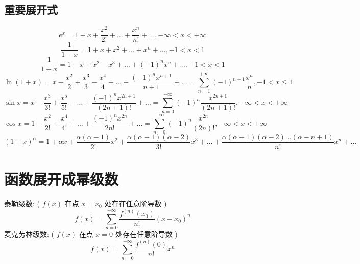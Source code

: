 \subsection{重要展开式}
\begin{theorem}\label{the: 重要幂级数展开式}
	$$e^{x}=1+x+\frac{x^2}{2!}+\dots+\frac{x^n}{n!}+\dots ,-\infty<x<+\infty$$
	$$\frac{1}{1-x}=1+x+x^2+\dots+x^{n}+\dots,-1<x<1$$
	$$\frac{1}{1+x}=1-x+x^2-x^3+\dots+(-1)^{n}x^{n}+\dots,-1<x<1$$
	$$\ln(1+x)=x-\frac{x^2}{2}+\frac{x^3}{3}-\frac{x^4}{4}+\dots+\frac{(-1)^nx^{n+1}}{n+1}+\dots=\sum\limits_{n=1}^{+\infty}(-1)^{n-1}\frac{x^{n}}{n},-1<x\leq 1$$
	$$\sin x=x-\frac{x^3}{3!}+\frac{x^5}{5!}-\dots+\frac{(-1)^{n}x^{2n+1}}{(2n+1)!}+\dots=\sum\limits_{n=0}^{+\infty}(-1)^{n}\frac{x^{2n+1}}{(2n+1)!},-\infty<x<+\infty$$
	$$\cos x=1-\frac{x^2}{2!}+\frac{x^4}{4!}+\dots+\frac{(-1)^nx^{2n}}{2n!}+\dots=\sum\limits_{n=0}^{+\infty}(-1)^{n}\frac{x^{2n}}{(2n)!},-\infty<x<+\infty$$
	$$(1+x)^{\alpha}=1+\alpha x+\frac{\alpha (\alpha-1)}{2!}x^2+\frac{\alpha (\alpha-1)(\alpha-2)}{3!}x^3+\dots+\frac{\alpha (\alpha-1)(\alpha-2)\dots(\alpha-n+1)}{n!}x^n+\dots$$
\end{theorem}
\section{函数展开成幂级数}
\label{函数展开成幂级数}
\begin{definition}
	泰勒级数:  ( $f(x)$ 在点 $x=x_{0}$ 处存在任意阶导数 )
	$$f(x)=\sum\limits_{n=0}^{+\infty}\frac{f^{(n)}(x_{0})}{n!}(x-x_{0})^n$$
	麦克劳林级数:  ( $f(x)$ 在点 $x=0$ 处存在任意阶导数 )
	$$f(x)=\sum\limits_{n=0}^{+\infty}\frac{f^{(n)}(0)}{n!}x^n$$
\end{definition}
